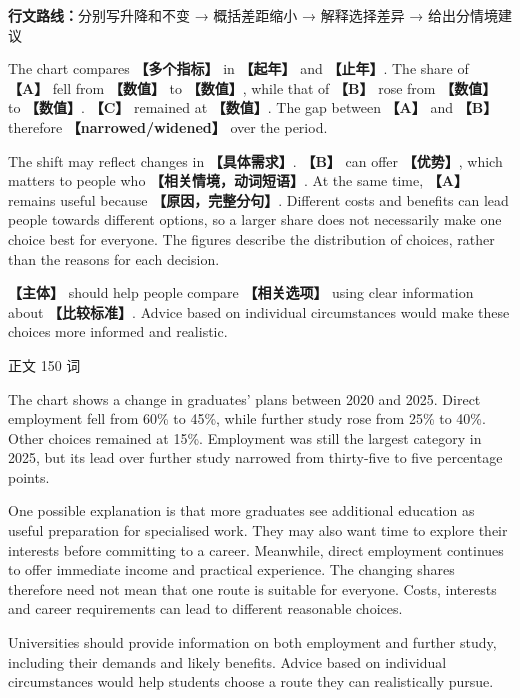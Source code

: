 \documentclass[11pt,a4paper,fontset=macnew]{ctexart}
\newenvironment{writing}{\begingroup\fontsize{10.5}{13.5}\selectfont\setlength{\parskip}{3pt}}{\par\endgroup}
\newenvironment{example}{\begingroup\fontsize{11}{14.3}\selectfont\setlength{\parskip}{4pt}}{\par\endgroup}
\begin{document}
{\small\textbf{行文路线：}分别写升降和不变 → 概括差距缩小 → 解释选择差异 → 给出分情境建议}\par
\par\vspace{4pt}{\bfseries 可替换模板}\par\nopagebreak
\begin{writing}
The chart compares {\bfseries 【多个指标】} in {\bfseries 【起年】} and {\bfseries 【止年】}. The share of {\bfseries 【A】} fell from {\bfseries 【数值】} to {\bfseries 【数值】}, while that of {\bfseries 【B】} rose from {\bfseries 【数值】} to {\bfseries 【数值】}. {\bfseries 【C】} remained at {\bfseries 【数值】}. The gap between {\bfseries 【A】} and {\bfseries 【B】} therefore {\bfseries 【narrowed/widened】} over the period.

The shift may reflect changes in {\bfseries 【具体需求】}. {\bfseries 【B】} can offer {\bfseries 【优势】}, which matters to people who {\bfseries 【相关情境，动词短语】}. At the same time, {\bfseries 【A】} remains useful because {\bfseries 【原因，完整分句】}. Different costs and benefits can lead people towards different options, so a larger share does not necessarily make one choice best for everyone. The figures describe the distribution of choices, rather than the reasons for each decision.

{\bfseries 【主体】} should help people compare {\bfseries 【相关选项】} using clear information about {\bfseries 【比较标准】}. Advice based on individual circumstances would make these choices more informed and realistic.

\end{writing}
\par\vspace{4pt}{\bfseries 完整套用示例}\par\nopagebreak
{\small 正文 150 词}\par
\begin{example}
The chart shows a change in graduates' plans between 2020 and 2025. Direct employment fell from 60\% to 45\%, while further study rose from 25\% to 40\%. Other choices remained at 15\%. Employment was still the largest category in 2025, but its lead over further study narrowed from thirty-five to five percentage points.

One possible explanation is that more graduates see additional education as useful preparation for specialised work. They may also want time to explore their interests before committing to a career. Meanwhile, direct employment continues to offer immediate income and practical experience. The changing shares therefore need not mean that one route is suitable for everyone. Costs, interests and career requirements can lead to different reasonable choices.

Universities should provide information on both employment and further study, including their demands and likely benefits. Advice based on individual circumstances would help students choose a route they can realistically pursue.

\end{example}
\end{document}
